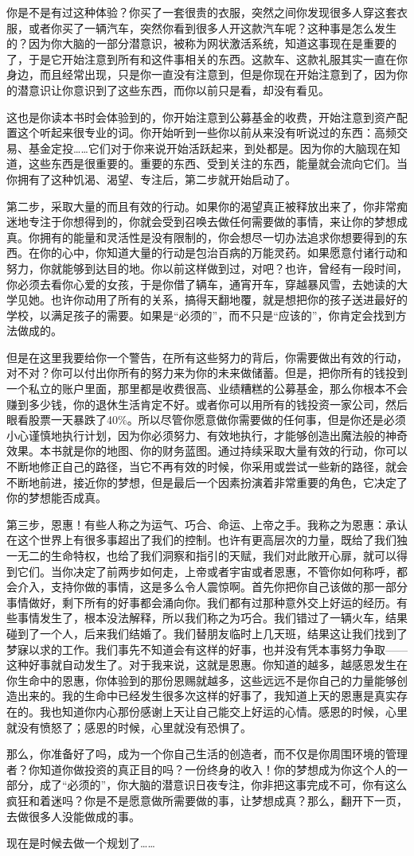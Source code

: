 你是不是有过这种体验？你买了一套很贵的衣服，突然之间你发现很多人穿这套衣服，或者你买了一辆汽车，突然你看到很多人开这款汽车呢？这种事是怎么发生的？因为你大脑的一部分潜意识，被称为网状激活系统，知道这事现在是重要的了，于是它开始注意到所有和这件事相关的东西。这款车、这款礼服其实一直在你身边，而且经常出现，只是你一直没有注意到，但是你现在开始注意到了，因为你的潜意识让你意识到了这些东西，而你以前只是看，却没有看见。

这也是你读本书时会体验到的，你开始注意到公募基金的收费，开始注意到资产配置这个听起来很专业的词。你开始听到一些你以前从来没有听说过的东西：高频交易、基金定投……它们对于你来说开始活跃起来，到处都是。因为你的大脑现在知道，这些东西是很重要的。重要的东西、受到关注的东西，能量就会流向它们。当你拥有了这种饥渴、渴望、专注后，第二步就开始启动了。

第二步，采取大量的而且有效的行动。如果你的渴望真正被释放出来了，你非常痴迷地专注于你想得到的，你就会受到召唤去做任何需要做的事情，来让你的梦想成真。你拥有的能量和灵活性是没有限制的，你会想尽一切办法追求你想要得到的东西。在你的心中，你知道大量的行动是包治百病的万能灵药。如果愿意付诸行动和努力，你就能够到达目的地。你以前这样做到过，对吧？也许，曾经有一段时间，你必须去看你心爱的女孩，于是你借了辆车，通宵开车，穿越暴风雪，去她读的大学见她。也许你动用了所有的关系，搞得天翻地覆，就是想把你的孩子送进最好的学校，以满足孩子的需要。如果是“必须的”，而不只是“应该的”，你肯定会找到方法做成的。

但是在这里我要给你一个警告，在所有这些努力的背后，你需要做出有效的行动，对不对？你可以付出你所有的努力来为你的未来做储蓄。但是，把你所有的钱投到一个私立的账户里面，那里都是收费很高、业绩糟糕的公募基金，那么你根本不会赚到多少钱，你的退休生活肯定不好。或者你可以用所有的钱投资一家公司，然后眼看股票一天暴跌了40\%。所以尽管你愿意做你需要做的任何事，但是你还是必须小心谨慎地执行计划，因为你必须努力、有效地执行，才能够创造出魔法般的神奇效果。本书就是你的地图、你的财务蓝图。通过持续采取大量有效的行动，你可以不断地修正自己的路径，当它不再有效的时候，你采用或尝试一些新的路径，就会不断地前进，接近你的梦想，但是最后一个因素扮演着非常重要的角色，它决定了你的梦想能否成真。

第三步，恩惠！有些人称之为运气、巧合、命运、上帝之手。我称之为恩惠：承认在这个世界上有很多事超出了我们的控制。也许有更高层次的力量，既给了我们独一无二的生命特权，也给了我们洞察和指引的天赋，我们对此敞开心扉，就可以得到它们。当你决定了前两步如何走，上帝或者宇宙或者恩惠，不管你如何称呼，都会介入，支持你做的事情，这是多么令人震惊啊。首先你把你自己该做的那一部分事情做好，剩下所有的好事都会涌向你。我们都有过那种意外交上好运的经历。有些事情发生了，根本没法解释，所以我们称之为巧合。我们错过了一辆火车，结果碰到了一个人，后来我们结婚了。我们替朋友临时上几天班，结果这让我们找到了梦寐以求的工作。我们事先不知道会有这样的好事，也并没有凭本事努力争取——这种好事就自动发生了。对于我来说，这就是恩惠。你知道的越多，越感恩发生在你生命中的恩惠，你体验到的那份恩赐就越多，这些远远不是你自己的力量能够创造出来的。我的生命中已经发生很多次这样的好事了，我知道上天的恩惠是真实存在的。我也知道你内心那份感谢上天让自己能交上好运的心情。感恩的时候，心里就没有愤怒了；感恩的时候，心里就没有恐惧了。

那么，你准备好了吗，成为一个你自己生活的创造者，而不仅是你周围环境的管理者？你知道你做投资的真正目的吗？一份终身的收入！你的梦想成为你这个人的一部分，成了“必须的”，你大脑的潜意识日夜专注，你非把这事完成不可，你有这么疯狂和着迷吗？你是不是愿意做所需要做的事，让梦想成真？那么，翻开下一页，去做很多人没能做成的事。

现在是时候去做一个规划了……
